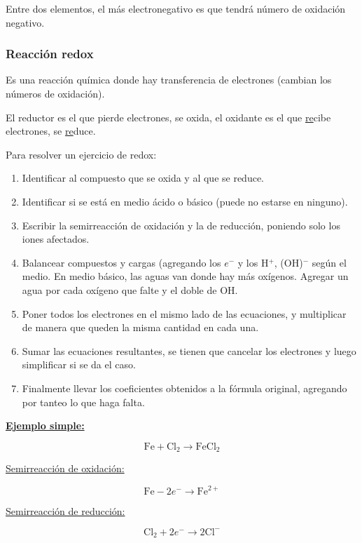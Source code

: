 Entre dos elementos, el más electronegativo es que tendrá número de oxidación negativo.

\subsubsection*{Reacción redox}

Es una reacción química donde hay transferencia de electrones (cambian los números de oxidación).

El reductor es el que pierde electrones, se oxida, el oxidante es el que \underline{re}cibe electrones, se \underline{re}duce.

Para resolver un ejercicio de redox:
\begin{enumerate}[itemsep=0pt, parsep=0.3em, topsep=0.3em]
    \item Identificar al compuesto que se oxida y al que se reduce.
    \item Identificar si se está en medio ácido o básico (puede no estarse en ninguno).
    \item Escribir la semirreacción de oxidación y la de reducción, poniendo solo los iones afectados.
    \item Balancear compuestos y cargas (agregando los $e^-$ y los H$^+$, (OH)$^-$ según el medio. En medio básico, las aguas van donde hay más oxígenos. Agregar un agua por cada oxígeno que falte y el doble de OH.
    \item Poner todos los electrones en el mismo lado de las ecuaciones, y multiplicar de manera que queden la misma cantidad en cada una.
    \item Sumar las ecuaciones resultantes, se tienen que cancelar los electrones y luego simplificar si se da el caso.
    \item Finalmente llevar los coeficientes obtenidos a la fórmula original, agregando por tanteo lo que haga falta.
\end{enumerate}

\newpage
\noindent\textbf{\underline{Ejemplo simple:}}

$$\text{Fe} + \text{Cl}_2 \longrightarrow \text{FeCl}_2$$

\begin{multicols}{2}

\underline{Semirreacción de oxidación:}

$$\text{Fe} - 2e^- \longrightarrow \text{Fe}^{2+}$$

\underline{Semirreacción de reducción:}

$$\text{Cl}_2 + 2e^- \longrightarrow 2\text{Cl}^{-} $$

\end{multicols}

